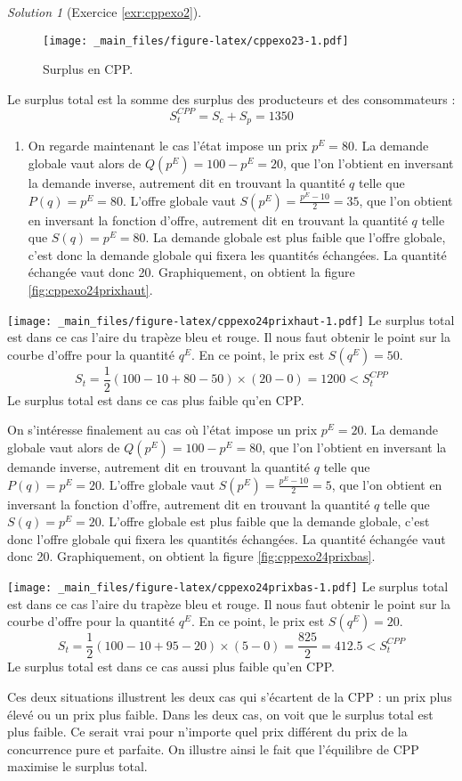 \documentclass[
]{book}
\providecommand{\tightlist}{%
  \setlength{\itemsep}{0pt}\setlength{\parskip}{0pt}}
\theoremstyle{definition}
\theoremstyle{definition}
\theoremstyle{definition}
\theoremstyle{definition}
\theoremstyle{remark}
\newtheorem*{solution}{Solution}
\begin{document}
\begin{solution}[Exercice \ref{exr:cppexo2}]
\begin{figure}
\centering
\texttt{[image: \_main\_files/figure-latex/cppexo23-1.pdf]}
\caption{\label{fig:cppexo23}Surplus en CPP.}
\end{figure}

Le surplus total est la somme des surplus des producteurs et des consommateurs :
\[
S_t^{CPP}=S_c+S_p=1350
\]

\begin{enumerate}
\def\labelenumi{\arabic{enumi}.}
\setcounter{enumi}{3}
\tightlist
\item
  On regarde maintenant le cas l'état impose un prix \(p^E=80\).
  La demande globale vaut alors de \(Q(p^E)=100-p^E=20\), que l'on l'obtient en inversant la demande inverse, autrement dit en trouvant la quantité \(q\) telle que \(P(q)=p^E=80\).
  L'offre globale vaut \(S(p^E)=\frac{p^E-10}{2}=35\), que l'on obtient en inversant la fonction d'offre, autrement dit en trouvant la quantité \(q\) telle que \(S(q)=p^E=80\).
  La demande globale est plus faible que l'offre globale, c'est donc la demande globale qui fixera les quantités échangées.
  La quantité échangée vaut donc 20.
  Graphiquement, on obtient la figure \ref{fig:cppexo24prixhaut}.
\end{enumerate}

\texttt{[image: \_main\_files/figure-latex/cppexo24prixhaut-1.pdf]}
Le surplus total est dans ce cas l'aire du trapèze bleu et rouge.
Il nous faut obtenir le point sur la courbe d'offre pour la quantité \(q^E\).
En ce point, le prix est \(S(q^E)=50\).
\[
S_t=\frac{1}{2}(100-10+80-50)\times(20-0)=1200 < S_t^{CPP}
\]
Le surplus total est dans ce cas plus faible qu'en CPP.

On s'intéresse finalement au cas où l'état impose un prix \(p^E=20\).
La demande globale vaut alors de \(Q(p^E)=100-p^E=80\), que l'on l'obtient en inversant la demande inverse, autrement dit en trouvant la quantité \(q\) telle que \(P(q)=p^E=20\).
L'offre globale vaut \(S(p^E)=\frac{p^E-10}{2}=5\), que l'on obtient en inversant la fonction d'offre, autrement dit en trouvant la quantité \(q\) telle que \(S(q)=p^E=20\).
L'offre globale est plus faible que la demande globale, c'est donc l'offre globale qui fixera les quantités échangées.
La quantité échangée vaut donc 20.
Graphiquement, on obtient la figure \ref{fig:cppexo24prixbas}.

\texttt{[image: \_main\_files/figure-latex/cppexo24prixbas-1.pdf]}
Le surplus total est dans ce cas l'aire du trapèze bleu et rouge.
Il nous faut obtenir le point sur la courbe d'offre pour la quantité \(q^E\).
En ce point, le prix est \(S(q^E)=20\).
\[
S_t=\frac{1}{2}(100-10+95-20)\times(5-0)=\frac{825}{2}=412.5 < S_t^{CPP}
\]
Le surplus total est dans ce cas aussi plus faible qu'en CPP.

Ces deux situations illustrent les deux cas qui s'écartent de la CPP : un prix plus élevé ou un prix plus faible.
Dans les deux cas, on voit que le surplus total est plus faible.
Ce serait vrai pour n'importe quel prix différent du prix de la concurrence pure et parfaite.
On illustre ainsi le fait que l'équilibre de CPP maximise le surplus total.
\end{solution}
\end{document}
